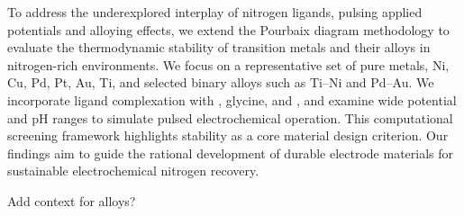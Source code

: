 \documentclass[journal=jacsat,manuscript=article]{achemso}
\begin{document}
To address the underexplored interplay of nitrogen ligands, pulsing applied potentials and alloying effects, we extend the Pourbaix diagram methodology to evaluate the thermodynamic stability of transition metals and their alloys in nitrogen-rich environments. We focus on a representative set of pure metals, Ni, Cu, Pd, Pt, Au, Ti, and selected binary alloys such as Ti–Ni and Pd–Au. We incorporate ligand complexation with , glycine, and , and examine wide potential and pH ranges to simulate pulsed electrochemical operation. This computational screening framework highlights stability as a core material design criterion. Our findings aim to guide the rational development of durable electrode materials for sustainable electrochemical nitrogen recovery.

Add context for alloys?




\end{document}
